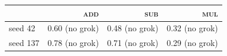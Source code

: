 \begin{tabular}{lrrr}
\toprule
 & \textsc{add} & \textsc{sub} & \textsc{mul} \\
\midrule
seed 42 & 0.60 (no grok) & 0.48 (no grok) & 0.32 (no grok) \\
seed 137 & 0.78 (no grok) & 0.71 (no grok) & 0.29 (no grok) \\
\bottomrule
\end{tabular}
